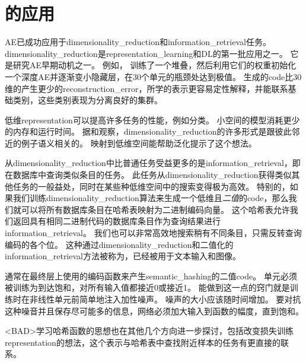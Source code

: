 
\section{的应用}
\label{sec:applications_of_autoencoders}

\gls{AE}已成功应用于\gls{dimensionality_reduction}和\gls{information_retrieval}任务。
\gls{dimensionality_reduction}是\gls{representation_learning}和\gls{DL}的第一批应用之一。
它是研究\gls{AE}早期动机之一。
例如， \citet{Hinton-Science2006}训练了一个堆叠，然后利用它们的权重初始化一个深度\gls{AE}并逐渐变小隐藏层，在30个单元的瓶颈处达到极值。
生成的\gls{code}比30维的产生更少的\gls{reconstruction_error}，所学的表示更容易定性解释，并能联系基础类别，这些类别表现为分离良好的集群。


低维\gls{representation}可以提高许多任务的性能，例如分类。
小空间的模型消耗更少的内存和运行时间。
据\citet{Salakhutdinov+Hinton2007-small}和\citet{Torralba+Fergus+Weiss-2008}观察，\gls{dimensionality_reduction}的许多形式是跟彼此邻近的例子语义相关的。
映射到低维空间能帮助泛化提示了这个想法。


从\gls{dimensionality_reduction}中比普通任务受益更多的是\gls{information_retrieval}，即在数据库中查询类似条目的任务。
此任务从\gls{dimensionality_reduction}获得类似其他任务的一般益处，同时在某些种低维空间中的搜索变得极为高效。
特别的，如果我们训练\gls{dimensionality_reduction}算法来生成一个低维且\emph{二值}的\gls{code}，那么我们就可以将所有数据库条目在哈希表映射为二进制编码向量。
这个哈希表允许我们返回具有相同二进制代码的数据库条目作为查询结果进行\gls{information_retrieval}。
我们也可以非常高效地搜索稍有不同条目，只需反转查询编码的各个位。
这种通过\gls{dimensionality_reduction}和二值化的\gls{information_retrieval}方法被称为\citep{Salakhutdinov+Hinton2007-small,Salakhutdinov+Geoff-2009}，已经被用于文本输入\citep{Salakhutdinov+Hinton2007-small,Salakhutdinov+Geoff-2009}和图像\citep{Torralba+Fergus+Weiss-2008,WeissTF08,KrizhevskyH11}。


通常在最终层上使用的编码函数来产生\gls{semantic_hashing}的二值\gls{code}。
单元必须被训练为到达饱和，对所有输入值都接近0或接近1。
能做到这一点的窍门就是训练时在非线性单元前简单地注入加性噪声。
噪声的大小应该随时间增加。
要对抗这种噪音并且保存尽可能多的信息，网络必须加大输入到函数的幅度，直到饱和。


<BAD>学习哈希函数的思想也在其他几个方向进一步探讨，包括改变损失训练\gls{representation}的想法，这个表示与哈希表中查找附近样本的任务有更直接的联系\citep{Norouzi+Fleet-ICML2011}。
